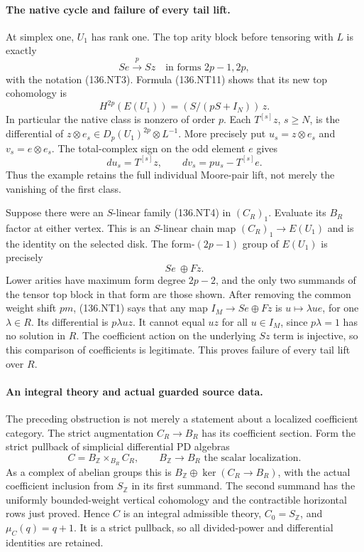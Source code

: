 \paragraph{The native cycle and failure of every tail lift.}
At simplex one, \(U_1\) has rank one. The top arity block before
tensoring with \(L\) is exactly
\[
             S e\xrightarrow{p}S z
                     \quad\text{in forms }2p-1,2p,
                                                        \tag{136.NT12}
\]
with the notation (136.NT3). Formula (136.NT11) shows that its
new top cohomology is
\[
                H^{2p}(E(U_1))=(S/(pS+I_N))\,z.        \tag{136.NT13}
\]
In particular the native class is nonzero of order \(p\).
Each \(T^{[s]}z\), \(s\geq N\), is the differential of
\(z\otimes e_s\in D_p(U_1)^{2p}\otimes L^{-1}\).
More precisely put \(u_s=z\otimes e_s\) and
\(v_s=e\otimes e_s\). The total-complex sign on the odd
element \(e\) gives
\[
       du_s=T^{[s]}z,\qquad
       dv_s=pu_s-T^{[s]}e.
                                                        \tag{136.NT16}
\]
Thus the example retains the full individual Moore-pair lift,
not merely the vanishing of the first class.

Suppose there were an \(S\)-linear family (136.NT4) in
\((C_R)_1\). Evaluate its \(B_R\) factor at either vertex.
This is an \(S\)-linear chain map
\((C_R)_1\to E(U_1)\) and is the identity on the selected disk.
The form-\((2p-1)\) group of \(E(U_1)\) is precisely
\[
                         S e\ \oplus F z.              \tag{136.NT14}
\]
Lower arities have maximum form degree \(2p-2\), and the only
two summands of the tensor top block in that form are those shown.
After removing the common weight shift \(pm\), (136.NT1)
says that any map \(I_M\to S e\oplus Fz\) is
\(u\mapsto\lambda u e\), for one \(\lambda\in R\).
Its differential is \(p\lambda u z\). It cannot equal
\(u z\) for all \(u\in I_M\), since \(p\lambda=1\) has
no solution in \(R\). The coefficient action on the underlying
\(S z\) term is injective, so this comparison of coefficients
is legitimate. This proves failure of every tail lift over \(R\).

\paragraph{An integral theory and actual guarded source data.}
The preceding obstruction is not merely a statement about a
localized coefficient category. The strict augmentation
\(C_R\to B_R\) has its coefficient section. Form the strict
pullback of simplicial differential PD algebras
\[
           C=B_{\mathbb Z}\times_{B_R} C_R,
            \qquad B_{\mathbb Z}\longrightarrow B_R
                       \text{ the scalar localization}. 
                                                        \tag{136.NT15}
\]
As a complex of abelian groups this is
\(B_{\mathbb Z}\oplus\ker(C_R\to B_R)\), with the actual
coefficient inclusion from \(S_{\mathbb Z}\) in its first summand.
The second summand has the uniformly bounded-weight vertical
cohomology and the contractible horizontal rows just proved.
Hence \(C\) is an integral admissible theory, \(C_0=S_{\mathbb Z}\),
and \(\mu_C(q)=q+1\). It is a strict pullback, so all
divided-power and differential identities are retained.

